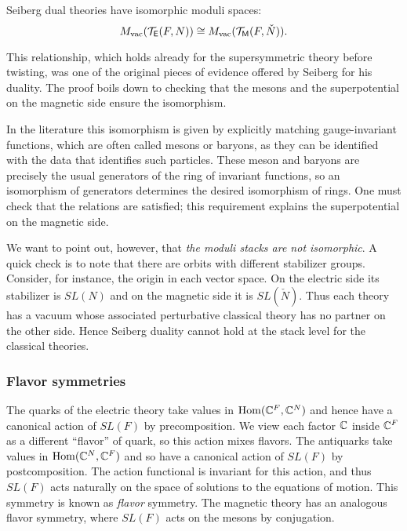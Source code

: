 \documentclass[11pt]{amsart}
\begin{document}
\begin{prop}
Seiberg dual theories have isomorphic moduli spaces:
\[
M_{\rm vac}(\mathcal T_{\mathsf E}(F,N)) \cong M_{\rm vac}(\mathcal T_{{\sf M}}(F,\check{N})).
\]
\end{prop}

This relationship, which holds already for the supersymmetric theory before twisting, was one of the original pieces of evidence offered by Seiberg for his duality.
The proof boils down to checking that the mesons and the superpotential on the magnetic side ensure the isomorphism.

\begin{rmk}
In the literature this isomorphism is given by explicitly matching gauge-invariant functions, 
which are often called mesons or baryons, 
as they can be identified with the data that identifies such particles.
These meson and baryons are precisely the usual generators of the ring of invariant functions, 
so an isomorphism of generators determines the desired isomorphism of rings. 
One must check that the relations are satisfied;
this requirement explains the superpotential on the magnetic side.
\end{rmk}

We want to point out, however, that {\em the moduli stacks are not isomorphic}.
A quick check is to note that there are orbits with different stabilizer groups.
Consider, for instance, the origin in each vector space.
On the electric side its stabilizer is $SL(N)$ and on the magnetic side it is $SL(\check{N})$.
Thus each theory has a vacuum whose associated perturbative classical theory has no partner on the other side.
Hence Seiberg duality cannot hold at the stack level for the classical theories.

\subsubsection{Flavor symmetries}

The quarks of the electric theory take values in ${\rm Hom}(\mathbb C^F, \mathbb C^N)$ and hence have a canonical action of $SL(F)$ by precomposition.
We view each factor $\mathbb C$ inside $\mathbb C^F$ as a different ``flavor'' of quark, so this action mixes flavors.
The antiquarks take values in ${\rm Hom}(\mathbb C^N, \mathbb C^F)$ and so have a canonical action of $SL(F)$ by postcomposition.
The action functional is invariant for this action, and thus $SL(F)$ acts naturally on the space of solutions to the equations of motion.
This symmetry is known as {\em flavor} symmetry.
The magnetic theory has an analogous flavor symmetry, where $SL(F)$ acts on the mesons by conjugation.
\end{document}
